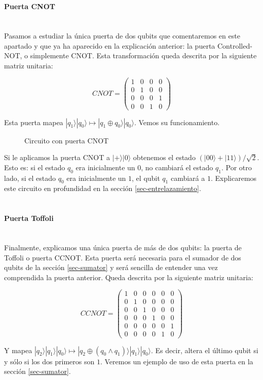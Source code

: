 \documentclass[11pt]{article}
\newcommand{\ra}{\rangle}
\newcommand{\myparagraph}[1]{\paragraph*{ \\ #1}\mbox{}\\}
\theoremstyle{plain}
\begin{document}
\myparagraph{Puerta CNOT}


Pasamos a estudiar la única puerta de dos qubits que comentaremos en este apartado y que ya ha aparecido en la explicación anterior: la puerta Controlled-NOT, o simplemente CNOT. Esta transformación queda descrita por la siguiente matriz unitaria:

\[
	CNOT =
	\begin{pmatrix}
	1 & 0 & 0 & 0 \\
	0 & 1 & 0 & 0 \\
	0 & 0 & 0 & 1 \\
	0 & 0 & 1 & 0
	\end{pmatrix}
\]

Esta puerta mapea $|q_1\ra|q_0\ra \mapsto |q_1 \oplus q_0\ra|q_0\ra$. Vemos su funcionamiento.

\begin{figure}[H]
	\centering
	\caption{Circuito con puerta CNOT}
\end{figure}

Si le aplicamos la puerta CNOT a $|+\ra|0\ra$ obtenemos el estado $(|00\ra + |11\ra)/\sqrt 2$. Esto es: si el estado $q_0$ era inicialmente un $0$, no cambiará el estado $q_1$. Por otro lado, si el estado $q_0$ era inicialmente un $1$, el qubit $q_1$ cambiará a $1$. Explicaremos este circuito en profundidad en la sección \ref{sec-entrelazamiento}.


\myparagraph{Puerta Toffoli}


Finalmente, explicamos una única puerta de más de dos qubits: la puerta de Toffoli o puerta CCNOT. Esta puerta será necesaria para el sumador de dos qubits de la sección \ref{sec-sumator} y será sencilla de entender una vez comprendida la puerta anterior. Queda descrita por la siguiente matriz unitaria:

\[
	CCNOT =
	\begin{pmatrix}
	1 & 0 & 0 & 0 & 0 & 0 \\
	0 & 1 & 0 & 0 & 0 & 0 \\
	0 & 0 & 1 & 0 & 0 & 0 \\
	0 & 0 & 0 & 1 & 0 & 0 \\
	0 & 0 & 0 & 0 & 0 & 1 \\
	0 & 0 & 0 & 0 & 1 & 0
	\end{pmatrix}
\]

Y mapea $|q_2\ra|q_1\ra|q_0\ra \mapsto |q_2 \oplus (q_0 \wedge q_1)\ra|q_1\ra|q_0\ra$. Es decir, altera el último qubit si y sólo si los dos primeros son $1$. Veremos un ejemplo de uso de esta puerta en la sección \ref{sec-sumator}.
\end{document}
